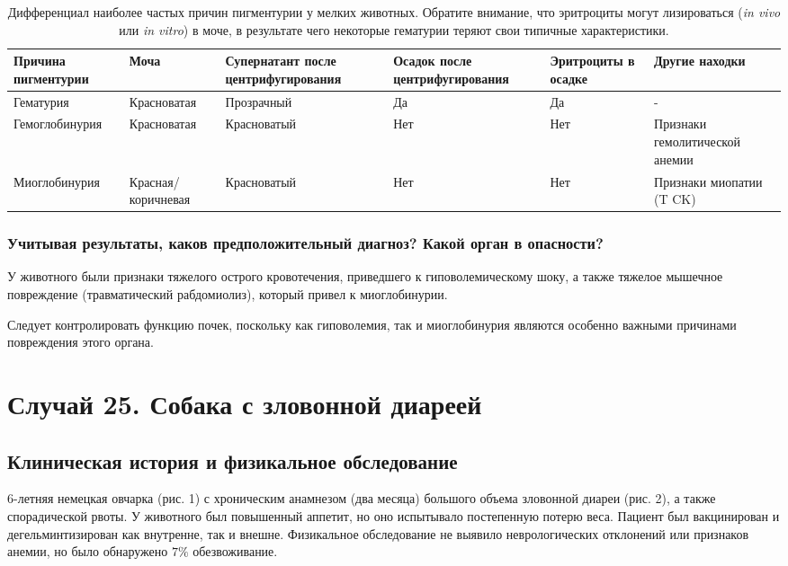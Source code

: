 \documentclass[a4paper,12pt]{book}
\begin{document}
\begin{table}[htbp]
\centering
\caption{Дифференциал наиболее частых причин пигментурии у мелких животных. Обратите внимание, что эритроциты могут лизироваться (\textit{in vivo} или \textit{in vitro}) в моче, в результате чего некоторые гематурии теряют свои типичные характеристики.}
\begin{tabular}{p{3cm}p{2cm}p{2cm}p{2cm}p{2cm}p{2cm}}
\toprule
Причина пигментурии & Моча & Супернатант после центрифугирования & Осадок после центрифугирования & Эритроциты в осадке & Другие находки \\
\midrule
Гематурия & Красноватая & Прозрачный & Да & Да & - \\
Гемоглобинурия & Красноватая & Красноватый & Нет & Нет & Признаки гемолитической анемии \\
Миоглобинурия & Красная/ коричневая & Красноватый & Нет & Нет & Признаки миопатии (T CK) \\
\bottomrule
\end{tabular}
\end{table}

\subsubsection*{Учитывая результаты, каков предположительный диагноз? Какой орган в опасности?}
У животного были признаки тяжелого острого кровотечения, приведшего к гиповолемическому шоку, а также тяжелое мышечное повреждение (травматический рабдомиолиз), который привел к миоглобинурии.

Следует контролировать функцию почек, поскольку как гиповолемия, так и миоглобинурия являются особенно важными причинами повреждения этого органа.

\section{Случай 25. Собака с зловонной диареей}
\subsection*{Клиническая история и физикальное обследование}
6-летняя немецкая овчарка (рис. 1) с хроническим анамнезом (два месяца) большого объема зловонной диареи (рис. 2), а также спорадической рвоты. У животного был повышенный аппетит, но оно испытывало постепенную потерю веса. Пациент был вакцинирован и дегельминтизирован как внутренне, так и внешне. Физикальное обследование не выявило неврологических отклонений или признаков анемии, но было обнаружено $7\%$ обезвоживание.
\end{document}
